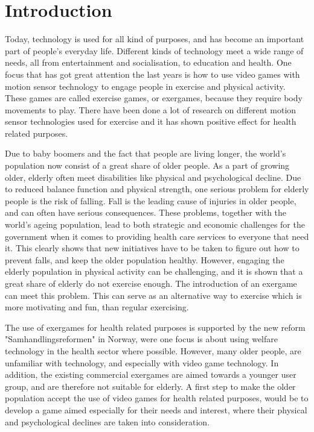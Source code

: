 \chapter{Introduction}

Today, technology is used for all kind of purposes, and has become an important part of people's everyday life. Different kinds of technology meet a wide range of needs, all from entertainment and socialisation, to education and health. One focus that has got great attention the last years is how to use video games with motion sensor technology to engage people in exercise and physical activity. These games are called exercise games, or exergames, because they require body movements to play. There have been done a lot of research on different motion sensor technologies used for exercise and it has shown positive effect for health related purposes. 

Due to baby boomers and the fact that people are living longer, the world's population now consist of a great share of older people. As a part of growing older, elderly often meet disabilities like physical and psychological decline. Due to reduced balance function and physical strength, one serious problem for elderly people is the risk of falling. Fall is the leading cause of injuries in older people, and can often have serious consequences. These problems, together with the world's ageing population, lead to both strategic and economic challenges for the government when it comes to providing health care services to everyone that need it. This clearly shows that new initiatives have to be taken to figure out how to prevent falls, and keep the older population healthy. However, engaging the elderly population in physical activity can be challenging, and it is shown that a great share of elderly do not exercise enough. The introduction of an exergame can meet this problem. This can serve as an alternative way to exercise which is more motivating and fun, than regular exercising.  

The use of exergames for health related purposes is supported by the new reform "Samhandlingsreformen" in Norway, were one focus is about using welfare technology in the health sector where possible. However, many older people, are unfamiliar with technology, and especially with video game technology. In addition, the existing commercial exergames are aimed towards a younger user group, and are therefore not suitable for elderly. A first step to make the older population accept the use of video games for health related purposes, would be to develop a game aimed especially for their needs and interest, where their physical and psychological declines are taken into consideration. 

